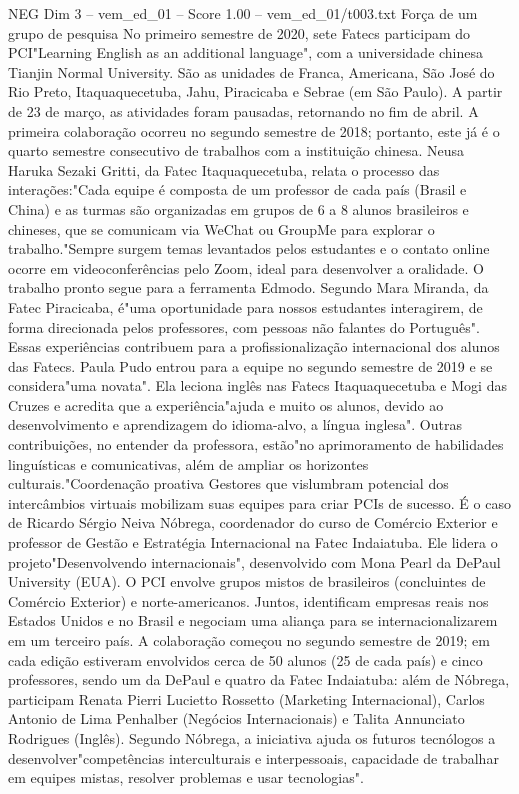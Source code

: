 \begin{textsample}{NEG Dim 3 – vem\_ed\_01 – Score 1.00 – vem\_ed\_01/t003.txt}  \label{ex:f3_neg_092}
Força de um grupo de pesquisa No primeiro semestre de 2020, sete Fatecs participam do PCI"Learning English as an additional language", com a universidade chinesa Tianjin Normal University.
São as unidades de Franca, Americana, São José do Rio Preto, Itaquaquecetuba, Jahu, Piracicaba e Sebrae (em São Paulo).
A partir de 23 de março, as atividades foram pausadas, retornando no fim de abril.
A primeira colaboração ocorreu no segundo semestre de 2018; portanto, este já é o quarto semestre consecutivo de trabalhos com a instituição chinesa.
Neusa Haruka Sezaki Gritti, da Fatec Itaquaquecetuba, relata o processo das interações:"Cada equipe é composta de um professor de cada país (Brasil e China) e as turmas são organizadas em grupos de 6 a 8 alunos brasileiros e chineses, que se comunicam via WeChat ou GroupMe para explorar o trabalho."Sempre surgem temas levantados pelos estudantes e o contato online ocorre em videoconferências pelo Zoom, ideal para desenvolver a oralidade.
O trabalho pronto segue para a ferramenta Edmodo.
Segundo Mara Miranda, da Fatec Piracicaba, é"uma oportunidade para nossos estudantes interagirem, de forma direcionada pelos professores, com pessoas não falantes do Português".
Essas experiências contribuem para a profissionalização internacional dos alunos das Fatecs.
Paula Pudo entrou para a equipe no segundo semestre de 2019 e se considera"uma novata".
Ela leciona inglês nas Fatecs Itaquaquecetuba e Mogi das Cruzes e acredita que a experiência"ajuda e muito os alunos, devido ao desenvolvimento e aprendizagem do idioma-alvo, a língua inglesa".
Outras contribuições, no entender da professora, estão"no aprimoramento de habilidades linguísticas e comunicativas, além de ampliar os horizontes culturais."Coordenação proativa Gestores que vislumbram potencial dos intercâmbios virtuais mobilizam suas equipes para criar PCIs de sucesso.
É o caso de Ricardo Sérgio Neiva Nóbrega, coordenador do curso de Comércio Exterior e professor de Gestão e Estratégia Internacional na Fatec Indaiatuba.
Ele lidera o projeto"Desenvolvendo internacionais", desenvolvido com Mona Pearl da DePaul University (EUA).
O PCI envolve grupos mistos de brasileiros (concluintes de Comércio Exterior) e norte-americanos.
Juntos, identificam empresas reais nos Estados Unidos e no Brasil e negociam uma aliança para se internacionalizarem em um terceiro país.
A colaboração começou no segundo semestre de 2019; em cada edição estiveram envolvidos cerca de 50 alunos (25 de cada país) e cinco professores, sendo um da DePaul e quatro da Fatec Indaiatuba: além de Nóbrega, participam Renata Pierri Lucietto Rossetto (Marketing Internacional), Carlos Antonio de Lima Penhalber (Negócios Internacionais) e Talita Annunciato Rodrigues (Inglês).
Segundo Nóbrega, a iniciativa ajuda os futuros tecnólogos a desenvolver"competências interculturais e interpessoais, capacidade de trabalhar em equipes mistas, resolver problemas e usar tecnologias".

\end{textsample}
